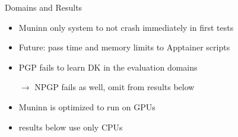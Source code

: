 \documentclass[aspectratio=169,xcolor=dvipsnames]{beamer}
\begin{document}
\begin{frame}{Domains and Results}

  \begin{itemize}
    \item \alert{Muninn} only system to not crash immediately in first tests
    \item Future: pass time and memory limits to Apptainer scripts
  \end{itemize}

  \bigskip

  \begin{itemize}
    \item PGP fails to learn DK in the evaluation domains
    \item[$\to$] \alert{NPGP} fails as well, omit from results below
  \end{itemize}
  \bigskip

  \begin{itemize}
    \item \alert{Muninn} is optimized to run on GPUs
    \item results below use only CPUs
\end{itemize}

\end{frame}
\end{document}
